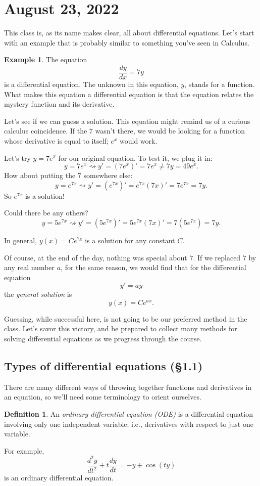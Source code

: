 \documentclass[12pt]{amsart}
\numberwithin{equation}{section}
\theoremstyle{plain} %
\newcommand{\Aug}[1]{\section{August #1, 2022}}
\newcommand{\rsa}{\rightsquigarrow}
\theoremstyle{definition}
\newtheorem{defn}[equation]{Definition}
\newtheorem{ex}[equation]{Example}
\theoremstyle{remark}
\begin{document}
\setcounter{tocdepth}{1}
\tableofcontents


\Aug{23}

This class is, as its name makes clear, all about differential equations. Let's start with an example that is probably similar to something you've seen in Calculus.

\begin{ex}
The equation
\[ \frac{dy}{dx} = 7 y\]
is a differential equation. The unknown in this equation, $y$, stands for a function. What makes this equation a differential equation is that the equation relates the mystery function and its derivative.

Let's see if we can guess a solution. This equation might remind us of a curious calculus coincidence. If the $7$ wasn't there, we would be looking for a function whose derivative is equal to itself; $e^x$ would work. 

Let's try $y=7e^x$ for our original equation. To test it, we plug it in:
\[ y = 7 e^x \rsa y' = (7e^x)' = 7e^x \neq 7y = 49e^x.\]
How about putting the $7$ somewhere else:
\[  y = e^{7x} \rsa y' = (e^{7x})' = e^{7x} (7x)' = 7 e^{7x} = 7y.\]
So $e^{7x}$ is a solution!

Could there be any others?
\[  y = 5e^{7x} \rsa y' = (5e^{7x})' = 5e^{7x} (7x)' = 7 (5e^{7x}) = 7y.\]

In general, $y(x) = C e^{7x}$ is a solution for any constant $C$.
\end{ex}

Of course, at the end of the day, nothing was special about $7$. If we replaced $7$ by any real number $a$, for the same reason, we would find that for the differential equation
\[ y' = ay\]
the \emph{general solution} is
\[ y(x) = C e^{ax}.\]

Guessing, while successful here, is not going to be our preferred method in the class. Let's savor this victory, and be prepared to collect many methods for solving differential equations as we progress through the course.

\subsection*{Types of differential equations (\S1.1)}
There are many different ways of throwing together functions and derivatives in an equation, so we'll need some terminology to orient ourselves.

\begin{defn} An \emph{ordinary differential equation (ODE)} is a differential equation involving only one independent variable; i.e., derivatives with respect to just one variable.
\end{defn}
 For example,
 \[ \frac{d^2 y}{dt^2} + t \frac{dy}{dt} = -y + \cos(ty)\]
 is an ordinary differential equation.
 
\end{document}

